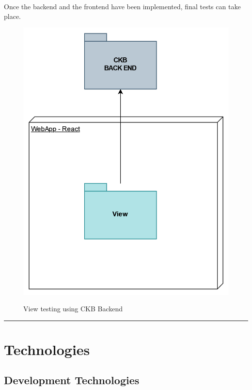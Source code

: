\documentclass{Configuration_Files/Template}
\begin{document}
Once the backend and the frontend have been implemented, final tests can take place.

\begin{figure}[H]
\centering
\includegraphics[scale = 0.55]{Images/diagrams/ImplementationPlan_Full.png}\\
\caption{View testing using CKB Backend}
\end{figure}

{\color{bluepoli}\rule{\linewidth}{0.1pt}}
\newpage
\section{Technologies}

\subsection{Development Technologies}
\end{document}
